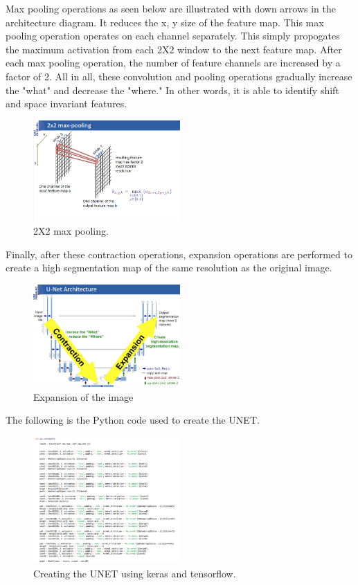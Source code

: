 \documentclass[letterpaper]{article}
\begin{document}
Max pooling operations as seen below are illustrated with down arrows in the architecture diagram. It reduces the x, y size of the feature map. This max pooling operation operates on each channel separately.  This simply propogates the maximum activation from each 2X2 window to the next feature map. After each max pooling operation, the number of feature channels are increased by a factor of 2. All in all, these convolution and pooling operations gradually increase the "what" and decrease the "where." In other words, it is able to identify shift and space invariant features. 


 \begin{figure}[H]
  \centerline{\includegraphics[width=0.5\textwidth]{Images/UNET2.png}}
  \caption{2X2 max pooling.}
  \label{fig:unet2}
\end{figure}

Finally, after these contraction operations, expansion operations are performed to create a high segmentation map of the same resolution as the original image.  	

 \begin{figure}[H]
  \centerline{\includegraphics[width=0.5\textwidth]{Images/UNET3.png}}
  \caption{Expansion of the image}
  \label{fig:unet3}
\end{figure}


The following is the Python code used to create the UNET. 

 \begin{figure}[H]
  \centerline{\includegraphics[width=0.5\textwidth]{Images/KerasUNET.png}}
  \caption{Creating the UNET using keras and tensorflow.}
  \label{fig:kerasunet3}
\end{figure}
\end{document}

